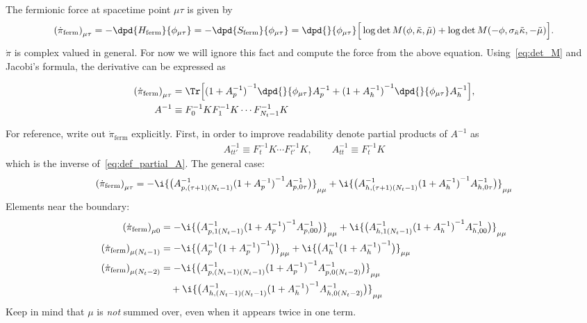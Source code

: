 \documentclass[a4paper, fleqn, twoside, notitlepage]{scrartcl}
\begin{document}
The fermionic force at spacetime point $\mu\tau$ is given by
\begin{align}
  {(\dot{\pi}_{\text{ferm}})}_{\mu\tau} = -\dpd{H_{\text{ferm}}}{\phi_{\mu\tau}} = -\dpd{S_\text{ferm}}{\phi_{\mu\tau}} =  \dpd{}{\phi_{\mu\tau}} \Big[\log \det M(\phi, \tilde{\kappa}, \tilde{\mu}) + \log \det M(-\phi, \sigma_{\tilde{\kappa}}\tilde{\kappa}, -\tilde{\mu})\Big].
\end{align}
$\dot{\pi}$ is complex valued in general. For now we will ignore this fact and compute the force from the above equation.
Using~\eqref{eq:det_M} and Jacobi's formula, the derivative can be expressed as
\begin{resultbox}
  \vspace{-\baselineskip}
  \begin{align}
    {(\dot{\pi}_{\text{ferm}})}_{\mu\tau} &= \Tr \Big[{(1+A_p^{-1})}^{-1}\dpd{}{\phi_{\mu\tau}}A_p^{-1} + {(1+A_h^{-1})}^{-1}\dpd{}{\phi_{\mu\tau}}A_h^{-1}\Big],\label{eq:force_v1}\\
    A^{-1} &\equiv F_0^{-1}K F_1^{-1}K \cdots F_{N_t-1}^{-1}K
  \end{align}
\end{resultbox}
\noindent
For reference, write out $\dot{\pi}_{\text{ferm}}$ explicitly. First, in order to improve readability denote partial products of $A^{-1}$ as
\begin{align}
  A^{-1}_{tt'} \equiv F_t^{-1}K \cdots F_{t'}^{-1}K, \qquad A^{-1}_{tt} \equiv F_t^{-1}K
\end{align}
which is the inverse of~\eqref{eq:def_partial_A}.
The general case:
\begin{align}
  {(\dot{\pi}_{\text{ferm}})}_{\mu\tau} = -\i {\big(A^{-1}_{p,(\tau+1)(N_t-1)} {(1+A_p^{-1})}^{-1} A^{-1}_{p,0\tau}\big)}_{\mu\mu} + \i {\big(A^{-1}_{h,(\tau+1)(N_t-1)} {(1+A_h^{-1})}^{-1} A^{-1}_{h,0\tau}\big)}_{\mu\mu}
\end{align}
Elements near the boundary:
\begin{align}
  {(\dot{\pi}_{\text{ferm}})}_{\mu0} &= -\i {\big(A^{-1}_{p,1(N_t-1)} {(1+A_p^{-1})}^{-1} A^{-1}_{p,00}\big)}_{\mu\mu} + \i {\big(A^{-1}_{h,1(N_t-1)} {(1+A_h^{-1})}^{-1} A^{-1}_{h,00}\big)}_{\mu\mu}\\
  {(\dot{\pi}_{\text{ferm}})}_{\mu(N_t-1)} &= -\i {\big(A^{-1}_{p} {(1+A_p^{-1})}^{-1}\big)}_{\mu\mu} + \i {\big(A^{-1}_{h} {(1+A_h^{-1})}^{-1}\big)}_{\mu\mu}\\
  {(\dot{\pi}_{\text{ferm}})}_{\mu(N_t-2)} &= -\i {\big(A^{-1}_{p,(N_t-1)(N_t-1)} {(1+A_p^{-1})}^{-1} A^{-1}_{p,0(N_t-2)}\big)}_{\mu\mu} \nonumber\\
                                 &\quad + \i {\big(A^{-1}_{h,(N_t-1)(N_t-1)} {(1+A_h^{-1})}^{-1} A^{-1}_{h,0(N_t-2)}\big)}_{\mu\mu}
\end{align}
Keep in mind that $\mu$ is \emph{not} summed over, even when it appears twice in one term.\\
\end{document}
